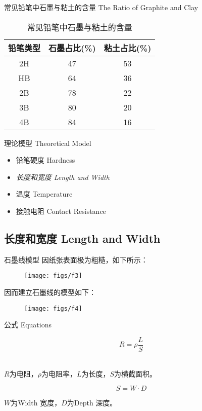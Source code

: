 \documentclass[10pt]{beamer}
\begin{document}
\begin{frame}{常见铅笔中石墨与粘土的含量 The Ratio of Graphite and Clay}
\begin{table}[htp]
	\caption{常见铅笔中石墨与粘土的含量}
	\centering
	\begin{tabular}{||c|c|c||}
		\hline
		铅笔类型&石墨占比(\%)&粘土占比(\%) \\ 
		\hline 
		2H&47  &53  \\ 
		\hline 
		HB&64  &36  \\ 
		\hline 
		2B&78  &22  \\ 
		\hline 
		3B&80  &20  \\ 
		\hline 
		4B&84  &16  \\ 
		\hline 
	\end{tabular} 
\end{table}
\pause

\end{frame}




\begin{frame}{理论模型 Theoretical Model}
\begin{itemize}

	\item 铅笔硬度 Hardness
	\item {\LARGE \textit{长度和宽度 Length and Width}}
	\item 温度 Temperature
	\item 接触电阻 Contact Resistance
\end{itemize}
\end{frame}


\subsection{长度和宽度 Length and Width}
\begin{frame}{石墨线模型}
因纸张表面极为粗糙，如下所示：
\begin{figure}
	\centering
	\texttt{[image: figs/f3]}
	\label{fig:f3}
\end{figure}

因而建立石墨线的模型如下：
\begin{figure}
	\centering
	\texttt{[image: figs/f4]}
	\label{fig:f3}
\end{figure}
	
\end{frame}
\begin{frame}{公式 Equations}
	\begin{theorem}
		$$R=\rho\frac{L}{S}$$ \\
		\begin{center}
					$ R $为电阻，$ \rho $为电阻率，$ L $为长度，$ S $为横截面积。
		\end{center}
	\end{theorem}
\pause
\begin{theorem}
	$$ S=W\cdot D $$
	\begin{center}
		$W$为Width 宽度，$ D $为Depth 深度。
	\end{center}
\end{theorem}
\end{frame}
\end{document}
